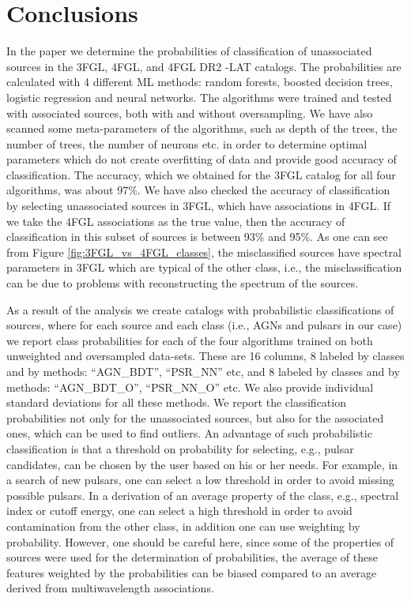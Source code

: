 \section{Conclusions}

In the paper we determine the probabilities of classification of unassociated sources in the 3FGL, 4FGL, and 4FGL DR2 \Fermi-LAT catalogs.
The probabilities are calculated with 4 different ML methods: random forests, boosted decision trees, logistic regression and neural networks.
The algorithms were trained and tested with associated sources, both with and without oversampling.
We have also scanned some meta-parameters of the algorithms, such as depth of the trees, the number of trees, the number of neurons etc. in order to determine optimal parameters which do not create overfitting of data and provide good accuracy of classification.
The accuracy, which we obtained for the 3FGL catalog for all four algorithms, was about 97\%.
We have also checked the accuracy of classification by selecting unassociated sources in 3FGL, which have associations in 4FGL.
If we take the 4FGL associations as the true value, then the accuracy of classification in this subset of sources is between 93\% and 95\%.
As one can see from Figure \ref{fig:3FGL_vs_4FGL_classes}, the misclassified sources have spectral parameters in 3FGL which are typical of the other class, i.e., the misclassification can be due to problems with reconstructing the spectrum of the sources.

As a result of the analysis we create catalogs with probabilistic classifications of sources, where for each source and each class (i.e., AGNs and pulsars in our case) we report class probabilities for each of the four algorithms trained on both unweighted and oversampled data-sets. These are 16 columns, 8 labeled by classes and by methods: ``AGN\_BDT'', ``PSR\_NN'' etc, and 8 labeled by classes and by methods: ``AGN\_BDT\_O'', ``PSR\_NN\_O'' etc. We also provide individual standard deviations for all these methods.
We report the classification probabilities not only for the unassociated sources, but also for the associated ones, which can be used to find outliers.
An advantage of such probabilistic classification is that a threshold on probability for selecting, e.g., pulsar candidates, can be chosen by the user based on his or her needs.
For example, in a search of new pulsars, one can select a low threshold in order to avoid missing possible pulsars.
In a derivation of an average property of the class, e.g., spectral index or cutoff energy, one can select a high threshold in order to avoid contamination from the other class, in addition one can use weighting by probability.
However, one should be careful here, since some of the properties of sources were used for the determination of probabilities,
the average of these features weighted by the probabilities can be biased compared to an average derived from multiwavelength associations.

